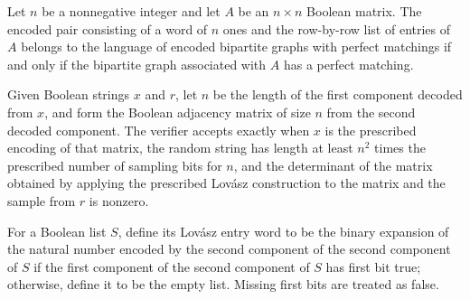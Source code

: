 \begin{theorem}
\label{Randomized.Matching.encodeBPM_mem_iff}
\leanok
{}
Let $n$ be a nonnegative integer and let $A$ be an $n\times n$ Boolean matrix. The
encoded pair consisting of a word of $n$ ones and the row-by-row list of entries of $A$
belongs to the language of encoded bipartite graphs with perfect matchings if and only
if the bipartite graph associated with $A$ has a perfect matching.
\end{theorem}

\begin{definition}
\label{Randomized.Matching.matchingVerifier}
\leanok
{}
Given Boolean strings $x$ and $r$, let $n$ be the length of the first component decoded
from $x$, and form the Boolean adjacency matrix of size $n$ from the second decoded
component. The verifier accepts exactly when $x$ is the prescribed encoding of that
matrix, the random string has length at least $n^2$ times the prescribed number of
sampling bits for $n$, and the determinant of the matrix obtained by applying the
prescribed Lovász construction to the matrix and the sample from $r$ is nonzero.
\end{definition}

\begin{definition}
\label{Randomized.Matching.lovaszEntryW}
\leanok
{}
For a Boolean list $S$, define its Lovász entry word to be the binary expansion of the
natural number encoded by the second component of the second component of $S$ if the
first component of the second component of $S$ has first bit true; otherwise, define it
to be the empty list. Missing first bits are treated as false.
\end{definition}

